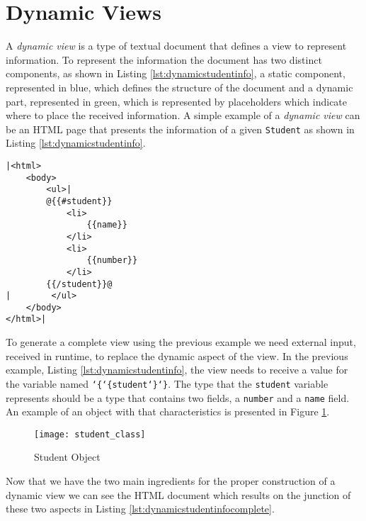 \section{Dynamic Views}

A \textit{dynamic view} is a type of textual document that defines a view to represent information. To represent the information the document has two distinct components, as shown in Listing \ref{lst:dynamicstudentinfo}, a static component, represented in blue, which defines the structure of the document and a dynamic part, represented in green, which is represented by placeholders which indicate where to place the received information. A simple example of a \textit{dynamic view} can be an \ac{HTML} page that presents the information of a given \texttt{Student} as shown in Listing \ref{lst:dynamicstudentinfo}. 

\bigskip

\begin{minipage}{\linewidth}
\begin{lstlisting}[caption={Dynamic Student Info - Using Mustache Template Engine}, label={lst:dynamicstudentinfo}, style=dynamicviewsex]
|<html>
    <body>
        <ul>|
        @{{#student}}
            <li>
                {{name}}
            </li>
            <li>
                {{number}}
            </li>
        {{/student}}@
|        </ul>
    </body>
</html>|
\end{lstlisting}
\end{minipage} 

\noindent
To generate a complete view using the previous example we need external input, received in runtime, to replace the dynamic aspect of the view. In the previous example, Listing \ref{lst:dynamicstudentinfo}, the view needs to receive a value for the variable named \texttt{\char`\{\char`\{student\char`\}\char`\}}. The type that the \texttt{student} variable represents should be a type that contains two fields, a \texttt{number} and a \texttt{name} field. An example of an object with that characteristics is presented in Figure \ref{img:studentclass}.

\begin{figure}[H]
	\centering
	\texttt{[image: student\_class]}
	\caption{Student Object}
	\label{img:studentclass}
\end{figure}

\noindent
Now that we have the two main ingredients for the proper construction of a dynamic view we can see the \ac{HTML} document which results on the junction of these two aspects in Listing \ref{lst:dynamicstudentinfocomplete}.

